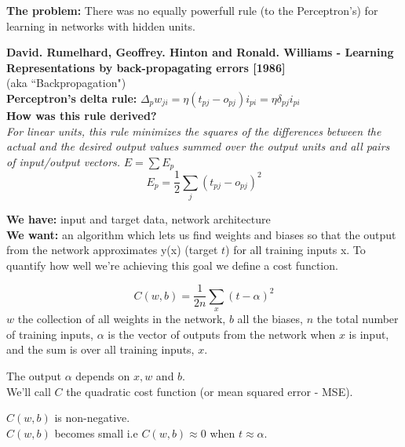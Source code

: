 \documentclass[10pt, compress]{beamer}
\begin{document}
\begin{frame}
  \vspace{.8cm}
  \textbf{The problem:} There was no equally powerfull rule (to the Perceptron's) for learning in networks with hidden units. \\
  \vspace{.5cm}

  \textbf{David. Rumelhard, Geoffrey. Hinton and Ronald. Williams - Learning Representations by back-propagating errors [1986]} \\
  (aka ``Backpropagation") \\

  \vspace{.5cm}
  \textbf{Perceptron's delta rule:} $\Delta_pw_{ji} = \eta (t_{pj} - o_{pj})i_{pi} = \eta \delta_{pj} i_{pi}$ \\ \hfill \break
  \textbf{How was this rule derived?} \\
  \textit{For linear units, this rule minimizes the squares of the differences between the actual and the desired output values summed over the output units and all pairs of input/output vectors.} $E = \sum E_p$
  $$ E_p = \frac{1}{2}\sum_j (t_{pj} - o_{pj})^2$$

\end{frame}

\begin{frame}
  \vspace{.5cm}
  \textbf{We have:} input and target data, network architecture \\
  \textbf{We want:} an algorithm which lets us find weights and biases so that the output from the network approximates y(x) (target $t$) for all training inputs x.  To quantify how well we're achieving this goal we define a cost function.

  $$ C(w, b) = \frac{1}{2n}\sum_x (t-\alpha)^2$$
  \textbf{$w$} the collection of all weights in the network, \textbf{$b$} all the biases, \textbf{$n$} the total number of training inputs, \textbf{$\alpha$} is the vector of outputs from the network when \textbf{$x$} is input, and the sum is over all training inputs, \textbf{$x$}.

  The output $\alpha$ depends on $x, w$ and $b$. \\
  We'll call $C$ the quadratic cost function (or mean squared error - MSE).

  $C(w,b)$ is non-negative. \\
  $C(w,b)$ becomes small i.e $C(w,b) \approx 0$ when $t \approx \alpha$.
\end{frame}
\end{document}
